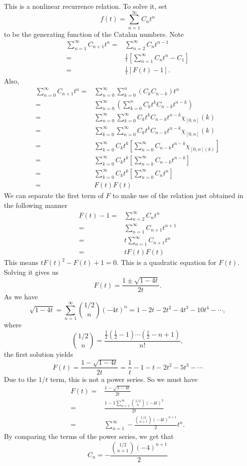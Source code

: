 This is a nonlinear recurrence relation. To solve it, set
$$ f(t) = \sum_{n=1}^{\infty} C_n t^n $$
to be the generating function of the Catalan numbers.
Note 
\begin{align}
	\sum_{n=1}^{\infty} C_{n+1} t^n
	 ={}& \sum_{n=2}^{\infty} C_n t^{n-1} \nonumber \\
	 ={}& \frac{1}{t} \left[ \sum_{n=1}^{\infty} C_n t^n - C_1 \right] \nonumber \\
	 ={}& \frac{1}{t} \left[ F(t) - 1 \right]. \label{eq:catalan-gen-fun-1}
\end{align}
 Also,
 \begin{align*}
	 \sum_{n=0}^{\infty} C_{n+1} t^n
	 ={}& \sum_{n=0}^{\infty} \sum_{k=0}^{n} \left( C_k C_{n-k} \right) t^n \\
	 ={}& \sum_{n=0}^{\infty} \left( \sum_{k=0}^{n} C_k t^k C_{n-k}
	 t^{n-k}\right) \\
	 ={}& \sum_{n=0}^{\infty} \sum_{k=0}^{\infty} 
	 C_k t^k C_{n-k} t^{n-k} \chi_{[0,n]} (k) \\
	 ={}& \sum_{k=0}^{\infty} \sum_{n=0}^{\infty} 
	 C_k t^k C_{n-k} t^{n-k} \chi_{[0,n]} (k) \\
	 ={}& \sum_{k=0}^{\infty} C_k t^k
	 \left[ \sum_{n=0}^{\infty} C_{n-k} t^{n-k} \chi_{[0,n](k)} \right] \\
	 ={}& \sum_{k=0}^{\infty} C_k t^{k} \left[ 
	 \sum_{n=k}^{\infty} C_{n-k} t^{n-k} \right] \\
	 ={}& \sum_{k=0}^{\infty} C_k t^k
	 \left[ \sum_{n=0}^{\infty} C_n t^n \right]\\
	 ={}& F(t) F(t)
 \end{align*}
 We can separate the first term of $F$ to make use of the 
 relation just obtained in the following manner
 \begin{align*}
	 F(t) - 1
	 ={}& \sum_{n=2}^{\infty} C_n t^n\\
	 ={}& \sum_{n=1}^{\infty} C_{n+1} t^{n+1}\\
	 ={}& t \sum_{n=1}^{\infty} C_{n+1} t^n\\
	 ={}& t F(t) F(t)
 \end{align*}
 This means $t F(t)^2 - F(t) +1 = 0.$
 This is a quadratic equation for $F(t).$
 Solving it gives us
 $$ F(t) = \frac{1 \pm \sqrt{1 - 4t}}{2t}. $$
 As we have $$ \sqrt{1 - 4t} =
 \sum_{n=1}^{\infty} \binom{1/2}{n} (-4t)^n
 = 1 - 2t - 2t^2 - 4t^3 - 10 t^4 - \cdots,
 $$ where $$ \binom{1/2}{n} = \frac{ \frac{1}{2} ( \frac{1}{2} - 1 )
\cdots ( \frac{1}{2} -n + 1)}{n!},$$
the first solution yields
$$ F(t) = \frac{1 - \sqrt{1 - 4t}}{2t}
 = \frac{1}{t} - 1 - t - 2t^2 - 5 t^3 - \cdots$$
Due to the $1/t$ term, this is not a power series.
So we must have
\begin{align*}
	F(t) ={}& \frac{1 - \sqrt{1 - 4t}}{2t}\\
	={}& \frac{1 - 1 \sum_{n=1}^{\infty} \binom{1/2}{n} (-4t)^2}
	{2t} \\
	={}& \sum_{n=1}^{\infty}  - \frac{\binom{1/2}{n+1} (-4t)^{n+1}}{2} t^n.
\end{align*}
By comparing the terms of the power series, we get that
$$C_n = - \frac{\binom{1/2}{n+1} (-4)^{n+1} }{2} $$
